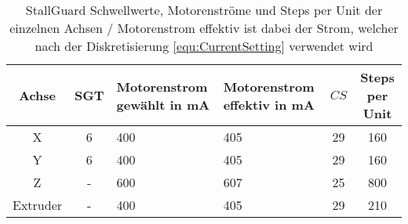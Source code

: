 \begin{table}[h]
\small
	\begin{center}
	\def\arraystretch{1.3} \tabcolsep=8pt
		\begin{tabular}{|c|c|C{3cm}|C{3cm}|c|c|}
			\hline
			Achse & SGT  & Motorenstrom gewählt in mA & Motorenstrom effektiv in mA  & $CS$ & Steps per Unit\\ \hline
			X &  6 & 400 & 405& 29 	& 160\\ \hline
			Y &  6 & 400 & 405 & 29	& 160 	\\ \hline
			Z &  - & 600 & 607 & 25 & 800	\\ \hline
			Extruder &  - & 400 & 405& 29 & 210 \\ \hline
		\end{tabular} 
	\end{center}
	\caption{StallGuard Schwellwerte, Motorenströme und Steps per Unit der einzelnen Achsen / Motorenstrom effektiv ist dabei der Strom, welcher nach der Diskretisierung \eqref{equ:CurrentSetting} verwendet wird}
	\label{tab:SGTValue}
\end{table}

